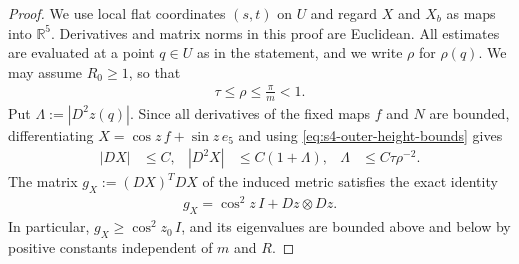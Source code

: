 \documentclass[a4paper,11pt,oneside,reqno]{amsart}
\numberwithin{equation}{section}
\theoremstyle{definition}
\begin{document}
\begin{proof}
    We use local flat coordinates $(s,t)$ on $U$ and regard
    $X$ and $X_b$ as maps into $\mathbb R^5$. Derivatives
    and matrix norms in this proof are Euclidean. All
    estimates are evaluated at a point $q\in U$ as in the
    statement, and we write $\rho$ for $\rho(q)$. We may
    assume $R_0\geq1$, so that
    \begin{align*}
        \tau\leq\rho\leq\frac{\pi}{m}<1.
    \end{align*}
    Put $\Lambda:=|D^2z(q)|$. Since all derivatives of the
    fixed maps $f$ and $N$ are bounded, differentiating
    $X=\cos z\,f+\sin z\,e_5$ and using
    \eqref{eq:s4-outer-height-bounds} gives
    \begin{align*}
        |DX|&\leq C,
        & |D^2X|&\leq C(1+\Lambda),
        & \Lambda&\leq C\tau\rho^{-2}.
    \end{align*}
    The matrix $g_X:=(DX)^T DX$ of the induced metric
    satisfies the exact identity
    \begin{align*}
        g_X=\cos^2z\,I+Dz\otimes Dz.
    \end{align*}
    In particular, $g_X\geq\cos^2z_0\,I$, and its
    eigenvalues are bounded above and below by positive
    constants independent of $m$ and $R$.


\end{proof}
\end{document}

